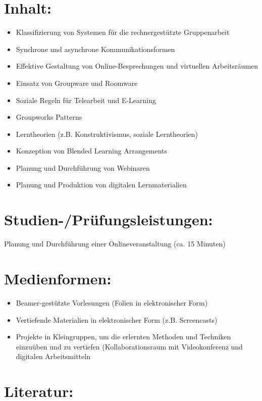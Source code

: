 \section*{Inhalt:}\label{inhalt-19}

\begin{itemize}
\item
  Klassifizierung von Systemen für die rechnergestützte Gruppenarbeit
\item
  Synchrone und asynchrone Kommunikationsformen
\item
  Effektive Gestaltung von Online-Besprechungen und virtuellen
  Arbeitsräumen
\item
  Einsatz von Groupware und Roomware
\item
  Soziale Regeln für Telearbeit und E-Learning
\item
  Groupworks Patterns
\item
  Lerntheorien (z.B. Konstruktivismus, soziale Lerntheorien)
\item
  Konzeption von Blended Learning Arrangements
\item
  Planung und Durchführung von Webinaren
\item
  Planung und Produktion von digitalen Lernmaterialien
\end{itemize}

\section*{Studien-/Prüfungsleistungen:}\label{studien-pruxfcfungsleistungen-19}

Planung und Durchführung einer Onlineveranstaltung (ca. 15 Minuten)

\section*{Medienformen:}\label{medienformen-19}

\begin{itemize}
\item
  Beamer-gestützte Vorlesungen (Folien in elektronischer Form)
\item
  Vertiefende Materialien in elektronischer Form (z.B. Screencasts)
\item
  Projekte in Kleingruppen, um die erlernten Methoden und Techniken
  einzuüben und zu vertiefen (Kollaborationsraum mit Videokonferenz und
  digitalen Arbeitsmitteln
\end{itemize}

\section*{Literatur:}\label{literatur-16}

